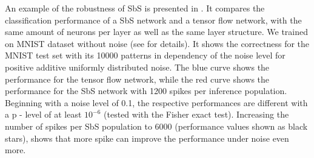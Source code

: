 An example of the robustness of SbS is presented in
. It compares the classification performance of
a SbS network and a tensor flow network, with the same amount of
neurons per layer as well as the same layer structure. We trained on MNIST dataset\cite{lecun1998mnist} without noise (see \cite{rotermund2019Backpropagation} for details). It shows the correctness for the MNIST test set with its 10000 patterns in dependency of the noise level for positive additive
uniformly distributed noise. The blue curve shows the performance for
the tensor flow network, while the red curve shows the performance for
the SbS network with 1200 spikes per inference population. Beginning
with a noise level of 0.1, the respective performances are different
with a p - level of at least $10^{-6}$ (tested with the Fisher exact
test). Increasing the number of spikes per SbS population to 6000
(performance values shown as black stars), shows that more spike can
improve the performance under noise even more. 

